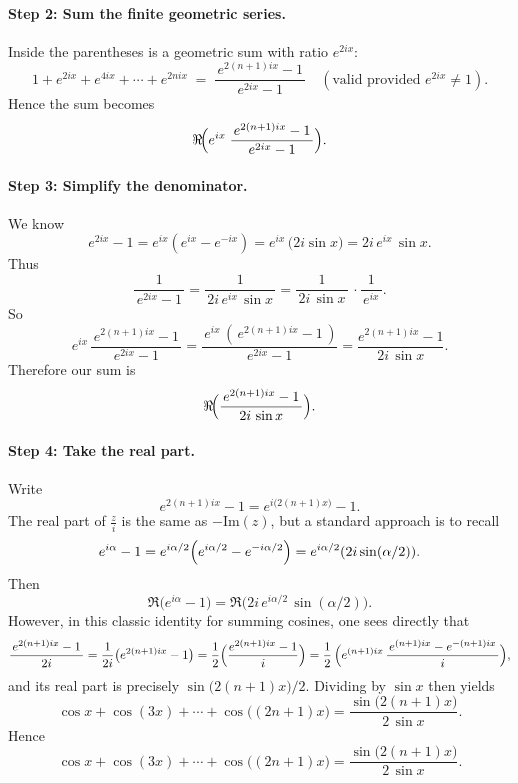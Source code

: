 \documentclass[12pt]{article}
\theoremstyle{definition} %
\theoremstyle{plain} %
\begin{document}
\paragraph{Step 2: Sum the finite geometric series.}
Inside the parentheses is a geometric sum with ratio $e^{2i x}$:
\[
1 + e^{2i x} + e^{4 i x} + \cdots + e^{2n i x}
\;=\;
\frac{\,e^{2(n+1)i x} - 1\,}{\,e^{2 i x} - 1\,}
\quad
(\text{valid provided } e^{2i x}\neq 1).
\]
Hence the sum becomes
\[
\Re\!\Bigl(
e^{i x}
\;\frac{\,e^{2(n+1)i x} - 1\,}{\,e^{2 i x} - 1\,}
\Bigr).
\]

\paragraph{Step 3: Simplify the denominator.}
We know
\[
e^{2 i x} - 1 = e^{i x}(e^{i x} - e^{-i x})
= e^{i x}\,\bigl(2i \sin x\bigr)
= 2i\,e^{i x}\,\sin x.
\]
Thus
\[
\frac{1}{\,e^{2 i x} - 1\,}
= \frac{1}{\,2i\, e^{i x}\,\sin x\,}
= \frac{1}{\,2i\,\sin x\,}\,\cdot \frac{1}{\,e^{i x}\,}.
\]
So
\[
e^{i x}\,\frac{\,e^{2(n+1)i x} - 1\,}{\,e^{2 i x} - 1\,}
= \frac{\,e^{i x}\,(\,e^{2(n+1)i x} - 1\,)}{\,e^{2 i x} - 1\,}
= \frac{e^{2(n+1)i x} - 1}{\,2i\,\sin x\,}.
\]
Therefore our sum is
\[
\Re\!\Bigl(
\frac{\,e^{2(n+1)i x} - 1\,}{\,2i\,\sin x\,}
\Bigr).
\]

\paragraph{Step 4: Take the real part.}
Write
\[
e^{2(n+1)i x} - 1
= e^{i\bigl(2(n+1)x\bigr)} - 1.
\]
The real part of $\frac{z}{i}$ is the same as $-\text{Im}(z)$, but a standard approach is to recall
\[
e^{i\alpha} - 1 
= e^{i\alpha/2}\Bigl(e^{i\alpha/2} - e^{-i\alpha/2}\Bigr)
= e^{i\alpha/2}(2i \sin(\alpha/2)).
\]
Then
\[
\Re\!\bigl(e^{i\alpha} - 1\bigr)
= \Re\!\bigl(2i\,e^{i\alpha/2}\,\sin(\alpha/2)\bigr).
\]
However, in this classic identity for summing cosines, one sees directly that
\[
\frac{\,e^{2(n+1)i x} - 1\,}{2i}
= \frac{1}{2i}\bigl(e^{2(n+1)i x} - 1\bigr)
= \frac{1}{2}\Bigl(\frac{e^{2(n+1)i x} - 1}{i}\Bigr)
= \frac{1}{2}\,\Bigl(e^{(n+1)i x}\,\frac{\,e^{(n+1)i x} - e^{-(n+1)i x}\,}{i}\Bigr),
\]
and its real part is precisely $\sin\!\bigl(2(n+1)x\bigr)/2$.  Dividing by $\sin x$ then yields
\[
\cos x + \cos(3x) + \cdots + \cos\bigl((2n+1)x\bigr)
= \frac{\sin\!\bigl(2(n+1)x\bigr)}{2\,\sin x}.
\]
Hence
\[
\boxed{
\cos x + \cos(3x) + \cdots + \cos\bigl((2n+1)x\bigr)
= \frac{\sin\!\bigl(2(n+1)x\bigr)}{2\,\sin x}
}.
\]

\bigskip
\end{document}
